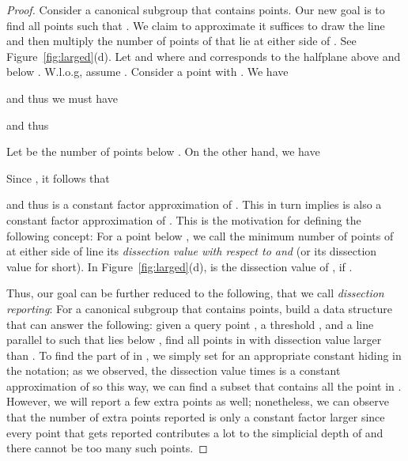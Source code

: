 \begin{proof}
    Consider a canonical subgroup  that contains  points.
    Our new goal is to find all  points   such that .
    We claim to approximate  it suffices to draw the 
    line  and then multiply the number of points of  that lie at either side of 
    .
    See Figure~\ref{fig:larged}(d). 
    Let  and  where  and 
    corresponds to the halfplane above and below .
    W.l.o.g, assume .
    Consider a point  with .
    We have
	
	and thus we must have
	
    and thus
    
    Let  be the number of points below .
    On the other hand, we have 
    
    Since , it follows that 
    
    and thus  is  a constant factor approximation of .
    This in turn implies  is also a constant factor approximation of .
    This is the motivation for defining the following concept:
    For a point  below , we call the minimum number of points of  
    at either side of line  its {\em dissection value with respect
    to  and \/} (or its dissection value for short).
    In Figure~\ref{fig:larged}(d),  is the dissection value of , if .

    Thus, our goal can be further reduced to the following, that we call \emph{dissection reporting}: 
    For a canonical subgroup  that contains  points,
    build a data structure that can answer the following:
    given a query point , a threshold , and a line  parallel to  such that 
     lies below , find all points in  with dissection value larger than .
    To find the part of  in , we simply set  for an appropriate constant
    hiding in the  notation; as we observed, the dissection value times  is a
    constant approximation of  so this way, we can find a subset that contains
    all the point in . 
    However, we will report a few extra points as well; nonetheless, we can observe that the number
    of extra points reported is only a constant factor larger since every point that gets reported
    contributes a lot to the simplicial depth of  and there cannot be too many such points.


\end{proof}
